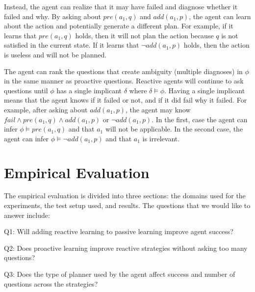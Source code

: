 \documentclass[letterpaper]{article}
\newenvironment{packed_itemize}{
\begin{itemize}
  \setlength{\itemsep}{1pt}
  \setlength{\parskip}{0pt}
  \setlength{\parsep}{0pt}
}{\end{itemize}}
\begin{document}
Instead, the agent can realize that it may have failed and diagnose whether it
failed and why.  By asking about $pre(a_1, q)$ and
$ add(a_1, p)$, the agent can learn about the action and potentially
generate a different plan.  For example, if it learns that $pre(a_1, q)$ holds,
then it will not plan the action because $q$ is not satisfied in the current
state.  If it learns that $\neg add(a_1, p)$ holds, then the action is useless
and will not be planned.

The agent can rank the questions that create ambiguity (multiple diagnoses) in
$\phi$ in the same manner as proactive questions.  Reactive agents will continue
to ask questions until $\phi$ has a single implicant $\delta$ where $\delta
\models \phi$. Having a single implicant means that the agent knows if it failed
or not, and if it did fail why it failed.  For example, after asking about
$add(a_1, p)$, the agent may know $fail \wedge pre(a_1, q) \wedge
add(a_1, p)$ or $\neg add(a_1, p)$.  In the first, case the agent can infer
$\phi \models pre(a_1, q)$ and that $a_1$ will not be applicable.  In the second
case, the agent can infer $\phi \models \neg add(a_1, p)$ and that $a_1$ is
irrelevant.




\section{Empirical Evaluation}
The empirical evaluation is divided into three sections:  the domains used for
the experiments, the test setup used, and results.  The questions that we would like to answer
include:



\begin{packed_itemize}
  \item Q1: Will adding reactive learning to passive
  learning improve agent success?
  \item Q2: Does proactive learning improve reactive strategies without
  asking too many questions?
  \item Q3: Does the type of planner used by the agent affect success and number
  of questions across the strategies?
\end{packed_itemize}
\end{document}
